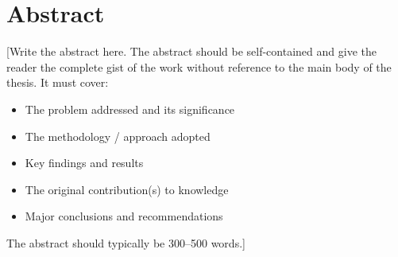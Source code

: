 \chapter*{Abstract}
\thispagestyle{plain}

[Write the abstract here. The abstract should be self-contained and
give the reader the complete gist of the work without reference to
the main body of the thesis. It must cover:

\begin{itemize}
    \item The problem addressed and its significance
    \item The methodology / approach adopted
    \item Key findings and results
    \item The original contribution(s) to knowledge
    \item Major conclusions and recommendations
\end{itemize}

The abstract should typically be 300--500 words.]

\newpage
